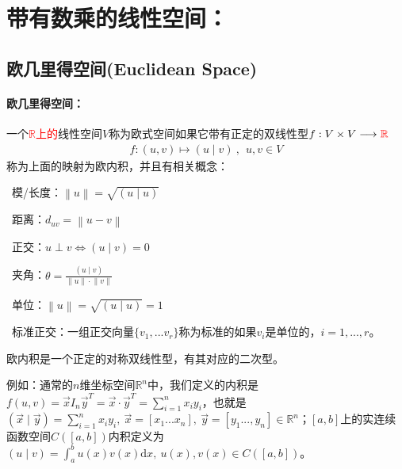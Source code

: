 \documentclass[zihao=-4,UTF8]{report}
\theoremstyle{mystyle} %
\begin{document}
\chapter{带有数乘的线性空间：}
\section{欧几里得空间(Euclidean Space)}
\subsubsection{欧几里得空间：}
一个\textcolor{red}{$\mathbb{R}$上的}线性空间$V$称为欧式空间如果它带有正定的双线性型$f: V\times V \longrightarrow \textcolor{red}{\mathbb{R}}$
\begin{gather*}
    f:(u,v) \longmapsto (u\mid v)\ ,\ \ u,v \in V    
\end{gather*}
称为上面的映射为欧内积，并且有相关概念：\par
{}\ 模/长度：$\left \| u \right \|  = \sqrt{(u\mid u)}$\par
{}\ 距离：$d_{uv} = \left \| u -v \right \|$\par
{}\ 正交：$u \perp v \Longleftrightarrow (u\mid v) = 0$\par
{}\ 夹角：$\theta = \frac{(u\mid v)}{ \left \| u \right \|\cdot  \left \| v \right \|}$ \par
{}\ 单位：$ \left \| u \right \| = \sqrt{(u\mid u) } = 1$\par
{}\ 标准正交：一组正交向量$\{v_1,...v_r\}$称为标准的如果$v_i$是单位的，$i = 1,...,r$。

{\color{gray}\small 欧内积是一个正定的对称双线性型，有其对应的二次型。\par
例如：通常的$n$维坐标空间$\mathbb{R}^n$中，我们定义的内积是$f(u,v) = \vec{x}I_n\vec{y}^T = \vec{x}\cdot\vec{y}^T = \sum_{i=1}^{n}x_iy_i $，也就是$(\vec{x} \mid \vec{y}) = \sum_{i = 1}^{n}x_iy_i,\ \vec{x} = [x_1 ... x_n],\ \vec{y} = [y_1...,y_n] \in \mathbb{R}^n$；$[a,b]$上的实连续函数空间$C([a,b])$内积定义为$(u \mid v) = \int_{a}^{b}u(x)v(x)\mathrm{d}x,\ u(x),v(x)\in C([a,b])$。}
\end{document}
